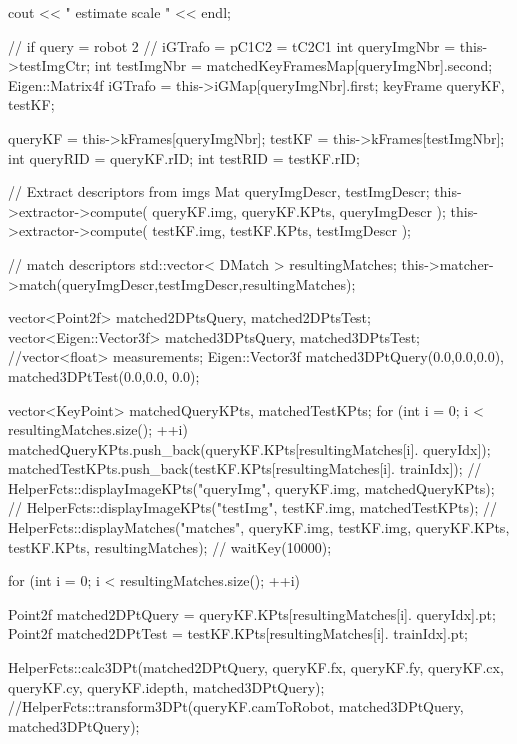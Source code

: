 \begin{DoxyCode}
                                   {
        cout << "       estimate scale " << endl;

        // if query = robot 2
        // iGTrafo = pC1C2 = tC2C1
        int queryImgNbr = this->testImgCtr;
        int testImgNbr = matchedKeyFramesMap[queryImgNbr].second;
        Eigen::Matrix4f iGTrafo = this->iGMap[queryImgNbr].first;
        keyFrame queryKF, testKF;


        queryKF = this->kFrames[queryImgNbr];
        testKF = this->kFrames[testImgNbr];
        int queryRID = queryKF.rID;
        int testRID = testKF.rID;

        // Extract descriptors from imgs
        Mat queryImgDescr, testImgDescr;
        this->extractor->compute( queryKF.img, queryKF.KPts, queryImgDescr );
        this->extractor->compute( testKF.img, testKF.KPts, testImgDescr );

        // match descriptors
        std::vector< DMatch > resultingMatches;
        this->matcher->match(queryImgDescr,testImgDescr,resultingMatches);

        vector<Point2f> matched2DPtsQuery, matched2DPtsTest;
        vector<Eigen::Vector3f> matched3DPtsQuery, matched3DPtsTest;
        //vector<float> measurements;
        Eigen::Vector3f matched3DPtQuery(0.0,0.0,0.0), matched3DPtTest(0.0,0.0,
      0.0);

        vector<KeyPoint> matchedQueryKPts, matchedTestKPts;
        for (int i = 0; i < resultingMatches.size(); ++i)       {
                matchedQueryKPts.push_back(queryKF.KPts[resultingMatches[i].
      queryIdx]);
                matchedTestKPts.push_back(testKF.KPts[resultingMatches[i].
      trainIdx]);
        }
//      HelperFcts::displayImageKPts("queryImg", queryKF.img,
       matchedQueryKPts);
//      HelperFcts::displayImageKPts("testImg", testKF.img, matchedTestKPts);
//      HelperFcts::displayMatches("matches", queryKF.img, testKF.img,
       queryKF.KPts, testKF.KPts, resultingMatches);
//      waitKey(10000);

        for (int i = 0; i < resultingMatches.size(); ++i)       {
                Point2f matched2DPtQuery = queryKF.KPts[resultingMatches[i].
      queryIdx].pt;
                Point2f matched2DPtTest = testKF.KPts[resultingMatches[i].
      trainIdx].pt;

                HelperFcts::calc3DPt(matched2DPtQuery, queryKF.fx, queryKF.fy, 
      queryKF.cx, queryKF.cy, queryKF.idepth, matched3DPtQuery);
                //HelperFcts::transform3DPt(queryKF.camToRobot,
       matched3DPtQuery, matched3DPtQuery);


}}
\end{DoxyCode}

